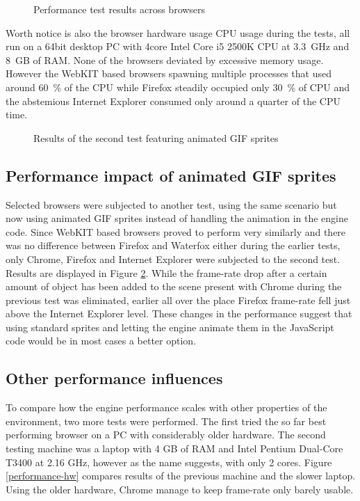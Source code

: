 \documentclass[11pt,oneside, final]{fithesis2}
\begin{document}
\begin{figure}[h]
	\centering
	
	\caption{Performance test results across browsers}
	\label{performance-basic}
\end{figure}

Worth notice is also the browser hardware usage CPU usage during the tests, all run on a 64bit desktop PC with 4core Intel Core i5 2500K CPU at 3.3~GHz and 8~GB of RAM. None of the browsers deviated by excessive memory usage. However the WebKIT based browsers spawning multiple processes that used around 60~\% of the CPU while Firefox steadily occupied only 30~\% of CPU and the abstemious Internet Explorer consumed only around a quarter of the CPU time.

\begin{figure}[h]
	\centering
	
	\caption{Results of the second test featuring animated GIF sprites}
	\label{performance-gif}
\end{figure}

\subsection{Performance impact of animated GIF sprites}
Selected browsers were subjected to another test, using the same scenario but now using animated GIF sprites instead of handling the animation in the engine code. Since WebKIT based browsers proved to perform very similarly and there was no difference between Firefox and Waterfox either during the earlier tests, only Chrome, Firefox and Internet Explorer were subjected to the second test. Results are displayed in Figure \ref{performance-gif}. While the frame-rate drop after a certain amount of object has been added to the scene present with Chrome during the previous test was eliminated, earlier all over the place Firefox frame-rate fell just above the Internet Explorer level. These changes in the performance suggest that using standard sprites and letting the engine animate them in the JavaScript code would be in most cases a better option.

\subsection{Other performance influences}
To compare how the engine performance scales with other properties of the environment, two more tests were performed. The first tried the so far best performing browser on a PC with considerably older hardware. The second testing machine was a laptop with 4 GB of RAM and Intel Pentium Dual-Core T3400 at 2.16 GHz, however as the name suggests, with only 2 cores. Figure \ref{performance-hw} compares results of the previous machine and the slower laptop. Using the older hardware, Chrome manage to keep frame-rate only barely usable.
\end{document}
